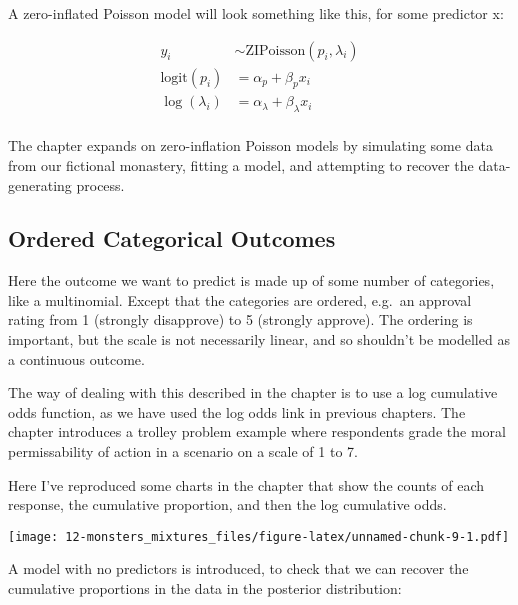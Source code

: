 \documentclass[
]{book}
\begin{document}
A zero-inflated Poisson model will look something like this, for some predictor x:

\[
\begin{aligned}
y_i & \sim \text{ZIPoisson}(p_i,\lambda_i) \\
\text{logit}(p_i)&= \alpha_p + \beta_p x_i\\
\log(\lambda_i)&= \alpha_\lambda + \beta_\lambda x_i\\
\end{aligned}
\]

The chapter expands on zero-inflation Poisson models by simulating some data from our fictional monastery, fitting a model, and attempting to recover the data-generating process.

\hypertarget{ordered-categorical-outcomes}{%
\subsection*{Ordered Categorical Outcomes}\label{ordered-categorical-outcomes}}

Here the outcome we want to predict is made up of some number of categories, like a multinomial. Except that the categories are ordered, e.g.~an approval rating from 1 (strongly disapprove) to 5 (strongly approve). The ordering is important, but the scale is not necessarily linear, and so shouldn't be modelled as a continuous outcome.

The way of dealing with this described in the chapter is to use a log cumulative odds function, as we have used the log odds link in previous chapters. The chapter introduces a trolley problem example where respondents grade the moral permissability of action in a scenario on a scale of 1 to 7.

Here I've reproduced some charts in the chapter that show the counts of each response, the cumulative proportion, and then the log cumulative odds.

\texttt{[image: 12-monsters\_mixtures\_files/figure-latex/unnamed-chunk-9-1.pdf]}

A model with no predictors is introduced, to check that we can recover the cumulative proportions in the data in the posterior distribution:
\end{document}

